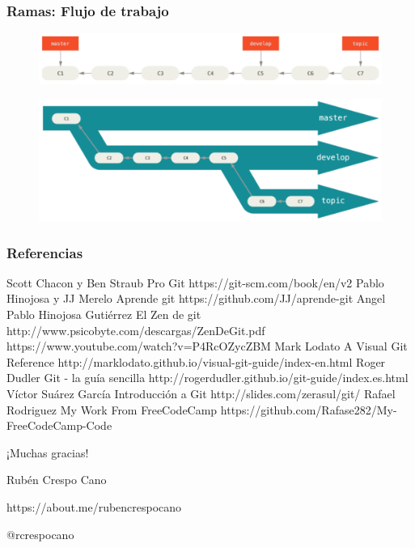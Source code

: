 \documentclass{beamer}
\begin{document}
\begin{frame}
\frametitle{Ramas: Flujo de trabajo}
\begin{figure}
\includegraphics[width=0.90\linewidth]{img/branching-9.png}
\end{figure}
\begin{figure}
\includegraphics[width=0.90\linewidth]{img/branching-10.png}
\end{figure}
\end{frame}

\begin{frame}
\frametitle{Referencias}
\begin{thebibliography}{99}
\tiny
\bibitem{} Scott Chacon y Ben Straub
\newblock Pro Git
\newblock https://git-scm.com/book/en/v2
\bibitem{} Pablo Hinojosa y JJ Merelo
\newblock Aprende git
\newblock https://github.com/JJ/aprende-git
\bibitem{} Angel Pablo Hinojosa Gutiérrez
\newblock El Zen de git
\newblock http://www.psicobyte.com/descargas/ZenDeGit.pdf
\newblock https://www.youtube.com/watch?v=P4RcOZycZBM
\bibitem{} Mark Lodato
\newblock A Visual Git Reference
\newblock http://marklodato.github.io/visual-git-guide/index-en.html
\bibitem{} Roger Dudler 
\newblock Git - la guía sencilla
\newblock http://rogerdudler.github.io/git-guide/index.es.html
\bibitem{} Víctor Suárez García
\newblock  Introducción a Git
\newblock http://slides.com/zerasul/git/
\bibitem{} Rafael Rodriguez
\newblock My Work From FreeCodeCamp
\newblock https://github.com/Rafase282/My-FreeCodeCamp-Code
\end{thebibliography}
\end{frame}

\begin{frame}
\Huge{\centerline{¡Muchas gracias!}}
\vskip 1.50cm
\small{\centerline{Rubén Crespo Cano}}
\small{\centerline{https://about.me/rubencrespocano}}
\small{\centerline{@rcrespocano}}
\end{frame}
\end{document}
